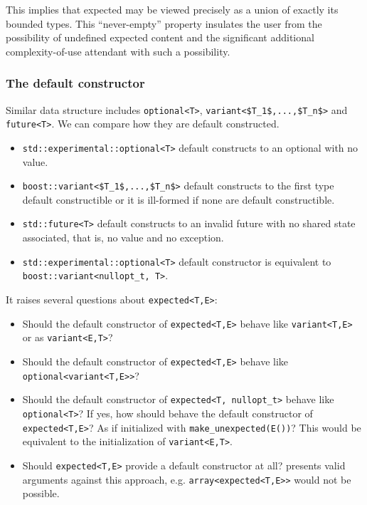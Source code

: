\documentclass[a4paper,10pt]{article}
\newcommand{\cpp}[1]{\lstinline{#1}}
\begin{document}
This implies that expected may be viewed precisely as a union of exactly its bounded types. This ``never-empty'' property insulates the user from the possibility of undefined expected content and the significant additional complexity-of-use attendant with such a possibility.

\subsubsection{The default constructor}

Similar data structure includes \cpp{optional<T>}, \lstinline[mathescape]{variant<$T_1$,...,$T_n$>} and \cpp{future<T>}. We can compare how they are default constructed.
\begin{itemize}
\item \cpp{std::experimental::optional<T>} default constructs to an optional with no value. 
\item \lstinline[mathescape]{boost::variant<$T_1$,...,$T_n$>} default constructs to the first type default constructible or it is ill-formed if none are default constructible.
\item \cpp{std::future<T>} default constructs to an invalid future with no shared state associated, that is, no value and no exception.
\item \cpp{std::experimental::optional<T>} default constructor is equivalent to \cpp{boost::variant<nullopt_t, T>}.
\end{itemize}

\noindent
It raises several questions about \cpp{expected<T,E>}:

\begin{itemize}
\item Should the default constructor of \cpp{expected<T,E>} behave like \cpp{variant<T,E>} or as \cpp{variant<E,T>}?
\item Should the default constructor of \cpp{expected<T,E>} behave like \cpp{optional<variant<T,E>>}?
\item Should the default constructor of \cpp{expected<T, nullopt_t>} behave like \cpp{optional<T>}? If yes, how should behave the default constructor of \cpp{expected<T,E>}? As if initialized with \cpp{make_unexpected(E())}? This would be equivalent to the initialization of \cpp{variant<E,T>}.
\item Should \cpp{expected<T,E>} provide a default constructor at all? \cite{OptionalRev3} presents valid arguments against this approach, e.g. \cpp{array<expected<T,E>>} would not be possible. 
\end{itemize}
\end{document}
